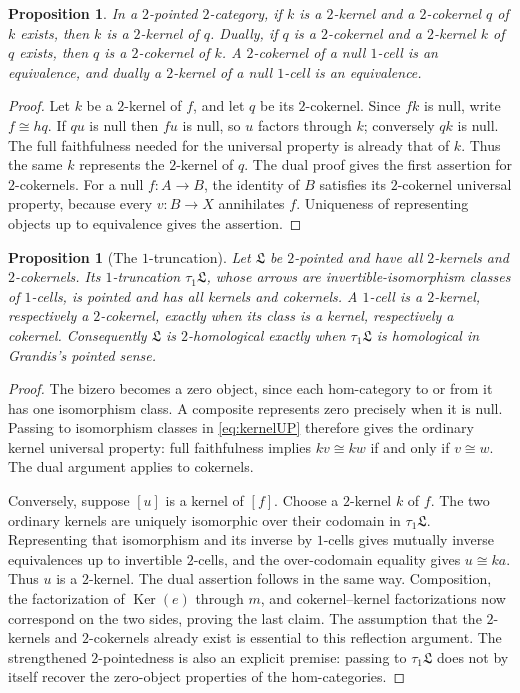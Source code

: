 \documentclass[11pt,reqno,a4paper]{amsart}
\newtheorem{proposition}[theorem]{Proposition}
\theoremstyle{definition}
\theoremstyle{remark}
\newcommand{\0}{\mathbf{0}}
\renewcommand{\1}{\mathbf{1}}
\newcommand{\Lcat}{\mathfrak L}
\DeclareMathOperator{\Ker}{Ker}
\begin{document}
\begin{proposition}\label{propkeriskerofitscoker}
In a $2$-pointed $2$-category, if $k$ is a $2$-kernel and
a $2$-cokernel $q$ of $k$ exists, then $k$ is a $2$-kernel
of $q$. Dually, if $q$ is a $2$-cokernel and a $2$-kernel
$k$ of $q$ exists, then $q$ is a $2$-cokernel of $k$.
A $2$-cokernel of a null $1$-cell is an equivalence, and dually a
$2$-kernel of a null $1$-cell is an equivalence.
\end{proposition}
\begin{proof}
Let $k$ be a $2$-kernel of $f$, and let $q$ be its $2$-cokernel.
Since $fk$ is null, write $f\cong hq$. If $qu$ is null then $fu$
is null, so $u$ factors through $k$; conversely $qk$ is null.
The full faithfulness needed for the universal property is already
that of $k$. Thus the same $k$ represents the $2$-kernel of $q$.
The dual proof gives the first assertion for $2$-cokernels.
For a null $f:A\to B$, the identity of $B$ satisfies its $2$-cokernel
universal property, because every $v:B\to X$ annihilates $f$.
Uniqueness of representing objects up to equivalence gives the assertion.
\end{proof}

\begin{proposition}[The $1$-truncation]\label{prop:truncation}
Let $\Lcat$ be $2$-pointed and have all $2$-kernels and $2$-cokernels.
Its $1$-truncation $\tau_1\Lcat$, whose arrows are invertible-isomorphism
classes of $1$-cells, is pointed and has all kernels and cokernels.
A $1$-cell is a $2$-kernel, respectively a $2$-cokernel, exactly when
its class is a kernel, respectively a cokernel. Consequently $\Lcat$
is $2$-homological exactly when $\tau_1\Lcat$ is homological in
Grandis's pointed sense.
\end{proposition}
\begin{proof}
The bizero becomes a zero object, since each hom-category to or from it
has one isomorphism class. A composite represents zero precisely when
it is null. Passing to isomorphism classes in \eqref{eq:kernelUP}
therefore gives the ordinary kernel universal property: full faithfulness
implies $kv\cong kw$ if and only if $v\cong w$. The dual argument applies
to cokernels.

Conversely, suppose $[u]$ is a kernel of $[f]$. Choose a $2$-kernel
$k$ of $f$. The two ordinary kernels are uniquely isomorphic over their
codomain in $\tau_1\Lcat$. Representing that isomorphism and its inverse
by $1$-cells gives mutually inverse equivalences up to invertible $2$-cells,
and the over-codomain equality gives $u\cong ka$. Thus $u$ is a
$2$-kernel. The dual assertion follows in the same way. Composition,
the factorization of $\Ker(e)$ through $m$, and cokernel--kernel
factorizations now correspond on the two sides, proving the last claim.
The assumption that the $2$-kernels and $2$-cokernels already exist is
essential to this reflection argument. The strengthened $2$-pointedness
is also an explicit premise: passing to $\tau_1\Lcat$ does not by
itself recover the zero-object properties of the hom-categories.
\end{proof}
\end{document}
